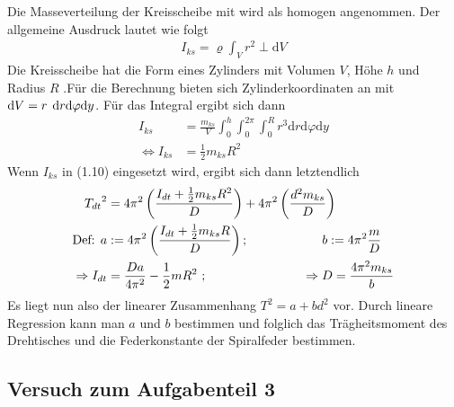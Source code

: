 \documentclass[11pt,a4paper]{article}
\begin{document}
Die Masseverteilung der Kreisscheibe mit wird als homogen angenommen. Der allgemeine Ausdruck lautet wie folgt
\begin{align*}
	I_{ks} = \varrho\int_{V}^{}r^2\perp\mathrm{d}V
\end{align*}
Die Kreisscheibe hat die Form eines Zylinders mit Volumen $V $, Höhe $h$ und Radius $R$ .Für die Berechnung bieten sich Zylinderkoordinaten an mit $\mathrm{d}V=r\hspace{0.15cm}\mathrm{d}r\mathrm{d}\varphi\mathrm{d}y$.
Für das Integral ergibt sich dann
\begin{align*}
	I_{ks} &= \frac{m_{ks}}{V} \int_{0}^{h}\int_{0}^{2\pi}\int_{0}^{R} r^3 \mathrm{d}r\mathrm{d}\varphi\mathrm{d}y \\
	\Leftrightarrow I_{ks} &= \frac{1}{2} m_{ks}R^2
\end{align*}
Wenn $I_{ks}$ in (1.10) eingesetzt wird, ergibt sich dann letztendlich
\begin{align*}
	{T_{dt}}^2 &= 4 \pi^2 \left(\frac{I_{dt}+ \frac{1}{2} m_{ks}R^2}{D}\right) +4\pi^2 \left(\frac{d^2m_{ks}}{D}\right)\\
	\text{Def: } a&:= 4\pi^2\left(\frac{I_{dt}+\frac{1}{2}m_{ks}R}{D}\right) \text{;  } \hspace{2cm}b:= 4\pi^2\frac{m}{D}\\
	\Rightarrow I_{dt} &= \frac{Da}{4\pi^2}-\frac{1}{2}mR^2\text{ ; }\hspace{2.6cm}\Rightarrow D = \frac{4\pi^2 m_{ks}}{b}
\end{align*}
Es liegt nun also der linearer Zusammenhang $T^2=a+bd^2$ vor. Durch lineare Regression kann man $a$ und $b$ bestimmen und folglich das Trägheitsmoment des Drehtisches und die Federkonstante der Spiralfeder bestimmen.





\subsection{Versuch zum Aufgabenteil 3}
\end{document}
